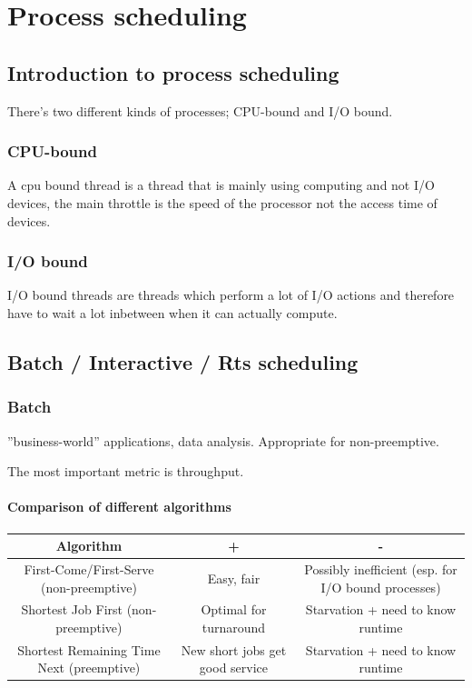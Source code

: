 
\chapter{Process scheduling}

\section{Introduction to process scheduling}
There's two different kinds of processes; CPU-bound and I/O bound.
\subsection{CPU-bound}
A cpu bound thread is a thread that is mainly using computing and not I/O devices, the main throttle is the speed of the processor not the access time of devices.

\subsection{I/O bound}
I/O bound threads are threads which perform a lot of I/O actions and therefore have to wait a lot inbetween when it can actually compute.

\section{Batch / Interactive / Rts scheduling}

\subsection{Batch}
''business-world” applications, data analysis. Appropriate for non-preemptive.

The most important metric is throughput.

\subsubsection{Comparison of different algorithms}
\begin{tabular}{|c|c|c|}
	\hline
	Algorithm                                 & +                               & -                                                   \\\hline
	First-Come/First-Serve (non-preemptive)   & Easy, fair                      & Possibly inefficient (esp. for I/O bound processes) \\\hline
	Shortest Job First (non-preemptive)       & Optimal for turnaround          & Starvation + need to know runtime                   \\\hline
	Shortest Remaining Time Next (preemptive) & New short jobs get good service & Starvation + need to know runtime                   \\\hline
\end{tabular}


